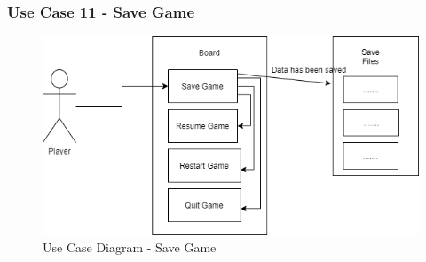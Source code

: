 \documentclass[12pt]{article}
\begin{document}
\newpage


\subsubsection{Use Case 11 - Save Game} \label{uc:11}

\begin{figure}[htbp]
    \centering
    \includegraphics[scale=0.6]{iteration1/images/Save Game.png}
    \caption{Use Case Diagram - Save Game}
    \label{fig:SaveGame}
\end{figure}
\end{document}
